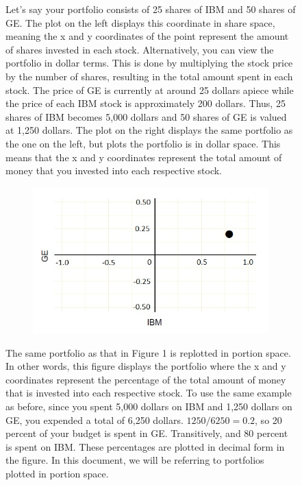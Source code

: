 \documentclass{article}\usepackage{graphicx, color}
\begin{document}
\begin{figure}[H]
\begin{subfigure}[b]{0.5\textwidth}
      \label{fig:dollarspace}
      \end{subfigure}
\caption{Let's say your portfolio consists of 25 shares of IBM and 50 shares of GE. The plot on the left displays this coordinate in share space, meaning the x and y coordinates of the point represent the amount of shares invested in each stock. Alternatively, you can view the portfolio in dollar terms. This is done by multiplying the stock price by the number of shares, resulting in the total amount spent in each stock. The price of GE is currently at around 25 dollars apiece while the price of each IBM stock is approximately 200 dollars. Thus, 25 shares of IBM becomes 5,000 dollars and 50 shares of GE is valued at 1,250 dollars. The plot on the right displays the same portfolio as the one on the left, but plots the portfolio is in dollar space. This means that the x and y coordinates represent the total amount of money that you invested into each respective stock.}
\end{figure}

\begin{figure}[H]
  \begin{subfigure}[b]{1.0\textwidth}
    \centering
    \includegraphics[width=\textwidth]{portionspace}
    \label{fig:portionspace}
  \end{subfigure}
\caption{The same portfolio as that in Figure 1 is replotted in portion space. In other words, this figure displays the portfolio where the x and y coordinates represent the percentage of the total amount of money that is invested into each respective stock. To use the same example as before, since you spent 5,000 dollars on IBM and 1,250 dollars on GE, you expended a total of 6,250 dollars. $1250/6250 = 0.2$, so 20 percent of your budget is spent in GE. Transitively, and 80 percent is spent on IBM. These percentages are plotted in decimal form in the figure. In this document, we will be referring to portfolios plotted in portion space.}
\end{figure}
\end{document}
